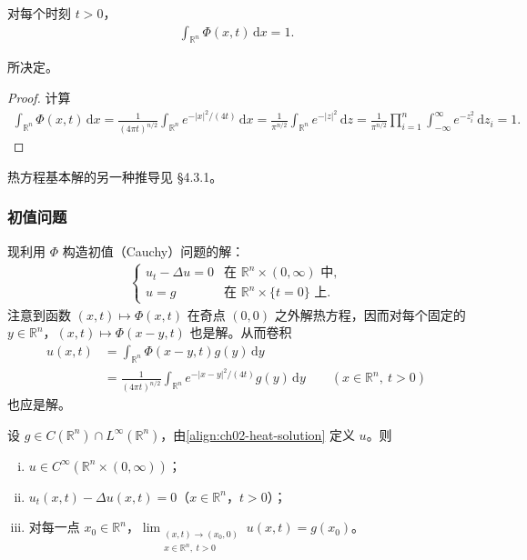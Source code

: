 \documentclass[../../main.tex]{subfiles}
\begin{document}
\begin{lemma}[基本解的积分]\label{lemma:ch02-heat-integral}对每个时刻 $t>0$，
\begin{align*}
\int_{\mathbb{R}^n}\Phi(x,t)\,\mathrm{d}x=1.
\end{align*}
\end{lemma}

\noindent 所决定。

\begin{proof}
计算
\begin{align*}
\int_{\mathbb{R}^n}\Phi(x,t)\,\mathrm{d}x
=\frac{1}{(4\pi t)^{n/2}}\int_{\mathbb{R}^n}e^{-|x|^2/(4t)}\,\mathrm{d}x
=\frac{1}{\pi^{n/2}}\int_{\mathbb{R}^n}e^{-|z|^2}\,\mathrm{d}z
=\frac{1}{\pi^{n/2}}\prod_{i=1}^n\int_{-\infty}^{\infty}e^{-z_i^2}\,\mathrm{d}z_i=1.
\end{align*}
\end{proof}

热方程基本解的另一种推导见 \S4.3.1。

\subsubsection{初值问题}

现利用 $\Phi$ 构造初值（Cauchy）问题的解：
\begin{align}\label{align:ch02-heat-ivp}
\begin{cases}
u_t-\Delta u=0 & \text{在 }\mathbb{R}^n\times(0,\infty)\text{ 中},\\
u=g & \text{在 }\mathbb{R}^n\times\{t=0\}\text{ 上}.
\end{cases}
\end{align}
注意到函数 $(x,t)\mapsto\Phi(x,t)$ 在奇点 $(0,0)$ 之外解热方程，因而对每个固定的 $y\in\mathbb{R}^n$，$(x,t)\mapsto\Phi(x-y,t)$ 也是解。从而卷积
\begin{align}\label{align:ch02-heat-solution}
u(x,t)&=\int_{\mathbb{R}^n}\Phi(x-y,t)g(y)\,\mathrm{d}y\\
&=\frac{1}{(4\pi t)^{n/2}}\int_{\mathbb{R}^n}e^{-|x-y|^2/(4t)}g(y)\,\mathrm{d}y \qquad (x\in\mathbb{R}^n,\ t>0)\nonumber
\end{align}
也应是解。

\begin{theorem}[初值问题的解]\label{theorem:ch02-heat-ivp}设 $g\in C(\mathbb{R}^n)\cap L^\infty(\mathbb{R}^n)$，由\eqref{align:ch02-heat-solution} 定义 $u$。则
\begin{enumerate}[(i)]
\item $u\in C^\infty(\mathbb{R}^n\times(0,\infty))$；
\item $u_t(x,t)-\Delta u(x,t)=0$（$x\in\mathbb{R}^n$，$t>0$）；
\item 对每一点 $x_0\in\mathbb{R}^n$，$\displaystyle\lim_{\substack{(x,t)\to(x_0,0)\\x\in\mathbb{R}^n,\ t>0}}u(x,t)=g(x_0)$。
\end{enumerate}
\end{theorem}
\end{document}
